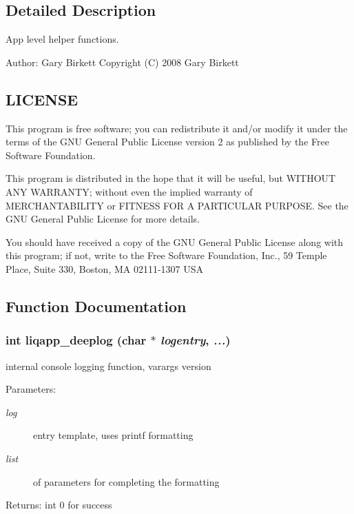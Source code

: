 \label{_details}
\subsection{Detailed Description}
App level helper functions. 

\begin{Desc}
\item[Author:]Gary Birkett Copyright (C) 2008 Gary Birkett\end{Desc}
\subsection{LICENSE}\label{de/d77/liqui_8c_LICENSE}
This program is free software; you can redistribute it and/or modify it under the terms of the GNU General Public License version 2 as published by the Free Software Foundation.

This program is distributed in the hope that it will be useful, but WITHOUT ANY WARRANTY; without even the implied warranty of MERCHANTABILITY or FITNESS FOR A PARTICULAR PURPOSE. See the GNU General Public License for more details.

You should have received a copy of the GNU General Public License along with this program; if not, write to the Free Software Foundation, Inc., 59 Temple Place, Suite 330, Boston, MA 02111-1307 USA 

\subsection{Function Documentation}
\subsubsection[{liqapp\_\-deeplog}]{\setlength{\rightskip}{0pt plus 5cm}int liqapp\_\-deeplog (char $\ast$ {\em logentry}, \/   {\em ...})}\label{d7/dbc/liqapp_8c_8f60c7ad37bab70f29be7c4f76581e7c}


internal console logging function, varargs version \begin{Desc}
\item[Parameters:]
\begin{description}
\item[{\em log}]entry template, uses printf formatting \item[{\em list}]of parameters for completing the formatting \end{description}
\end{Desc}
\begin{Desc}
\item[Returns:]int 0 for success \end{Desc}



